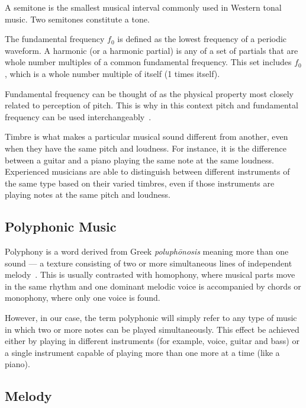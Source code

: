 A semitone is the smallest musical interval commonly used in Western tonal music. Two semitones constitute a tone.

The fundamental frequency $f_{\text{0}}$ is defined as the lowest frequency of a periodic waveform. A harmonic (or a harmonic partial) is any of a set of partials that are whole number multiples of a common fundamental frequency. This set includes $f_{0}$, which is a whole number multiple of itself (1 times itself).

Fundamental frequency can be thought of as the physical property most closely related to perception of pitch. This is why in this context pitch and fundamental frequency can be used interchangeably~\cite{salamon}.

Timbre is what makes a particular musical sound different from another, even when they have the same pitch and loudness. For instance, it is the difference between a guitar and a piano playing the same note at the same loudness. Experienced musicians are able to distinguish between different instruments of the same type based on their varied timbres, even if those instruments are playing notes at the same pitch and loudness.

\vspace{10pt}

\subsection{Polyphonic Music}

Polyphony is a word derived from Greek \textit{poluph\={o}nosis} meaning more than one sound — a texture consisting of two or more simultaneous lines of independent melody~\cite{polyphonic}. This is usually contrasted with homophony, where musical parts move in the same rhythm and one dominant melodic voice is accompanied by chords or monophony, where only one voice is found. 

However, in our case, the term polyphonic will simply refer to any type of music in which two or more notes can be played simultaneously. This effect be achieved either by playing in different instruments (for example, voice, guitar and bass) or a single instrument capable of playing more than one more at a time (like a piano).

\vspace{10pt}

\subsection{Melody}

